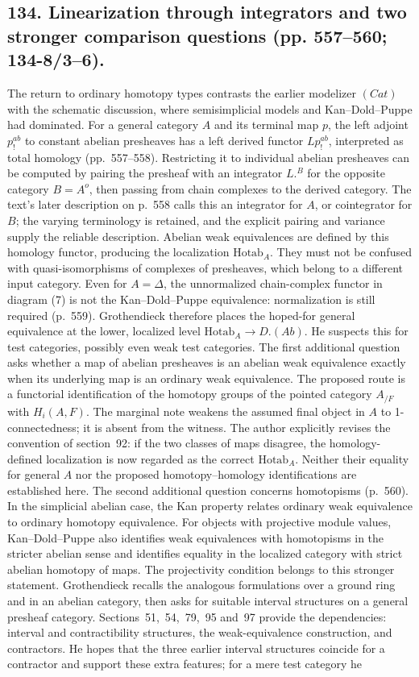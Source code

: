 \documentclass[10pt,oneside]{book}
\begin{document}
\subsection*{134. Linearization through integrators and two stronger comparison questions (pp. 557--560; 134-8/3--6).}
The return to ordinary homotopy types contrasts the earlier modelizer $(Cat)$ with the schematic discussion, where semisimplicial models and Kan--Dold--Puppe had dominated. For a general category $A$ and its terminal map $p$, the left adjoint $p^{ab}_{!}$ to constant abelian presheaves has a left derived functor $Lp^{ab}_{!}$, interpreted as total homology (pp.~557--558). Restricting it to individual abelian presheaves can be computed by pairing the presheaf with an integrator $L.^B$ for the opposite category $B=A^o$, then passing from chain complexes to the derived category. The text's later description on p.~558 calls this an integrator for $A$, or cointegrator for $B$; the varying terminology is retained, and the explicit pairing and variance supply the reliable description. Abelian weak equivalences are defined by this homology functor, producing the localization $\mathrm{Hotab}_A$. They must not be confused with quasi-isomorphisms of complexes of presheaves, which belong to a different input category. Even for $A=\Delta$, the unnormalized chain-complex functor in diagram (7) is not the Kan--Dold--Puppe equivalence: normalization is still required (p.~559). Grothendieck therefore places the hoped-for general equivalence at the lower, localized level $\mathrm{Hotab}_A\to D.(Ab)$. He suspects this for test categories, possibly even weak test categories. The first additional question asks whether a map of abelian presheaves is an abelian weak equivalence exactly when its underlying map is an ordinary weak equivalence. The proposed route is a functorial identification of the homotopy groups of the pointed category $A_{/F}$ with $H_i(A,F)$. The marginal note weakens the assumed final object in $A$ to 1-connectedness; it is absent from the witness. The author explicitly revises the convention of section~92: if the two classes of maps disagree, the homology-defined localization is now regarded as the correct $\mathrm{Hotab}_A$. Neither their equality for general $A$ nor the proposed homotopy--homology identifications are established here. The second additional question concerns homotopisms (p.~560). In the simplicial abelian case, the Kan property relates ordinary weak equivalence to ordinary homotopy equivalence. For objects with projective module values, Kan--Dold--Puppe also identifies weak equivalences with homotopisms in the stricter abelian sense and identifies equality in the localized category with strict abelian homotopy of maps. The projectivity condition belongs to this stronger statement. Grothendieck recalls the analogous formulations over a ground ring and in an abelian category, then asks for suitable interval structures on a general presheaf category. Sections~51,~54,~79,~95 and~97 provide the dependencies: interval and contractibility structures, the weak-equivalence construction, and contractors. He hopes that the three earlier interval structures coincide for a contractor and support these extra features; for a mere test category he 
\end{document}
